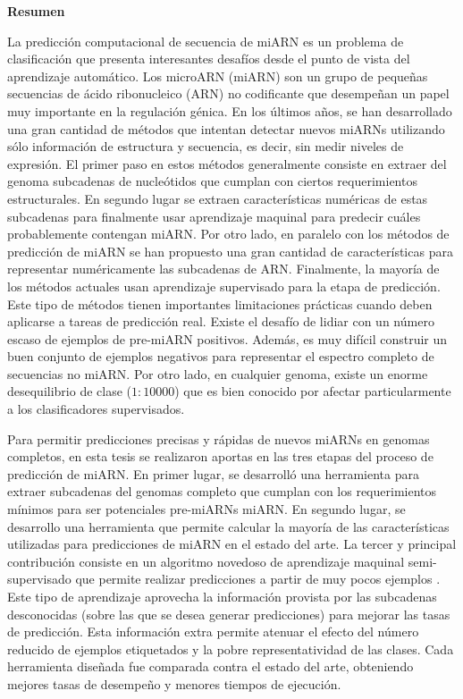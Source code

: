 \newpage
\thispagestyle{empty}

\vspace{3cm}
\begin{center}
{\huge \textbf{Resumen}}
\end{center}
\vspace{1cm}

La predicción computacional de secuencia de miARN es un problema de clasificación que presenta interesantes desafíos desde el punto de vista del
aprendizaje automático. Los microARN (miARN) son un grupo de pequeñas secuencias de ácido ribonucleico (ARN) no codificante que desempeñan un papel muy importante en la
regulación génica. En los últimos años, se han desarrollado una gran cantidad de métodos que intentan detectar nuevos miARNs utilizando sólo información
de estructura y secuencia, es decir, sin medir niveles de expresión. El primer paso en estos métodos generalmente consiste en extraer del genoma subcadenas
de nucleótidos que cumplan con ciertos requerimientos estructurales. En segundo lugar se extraen características numéricas de estas subcadenas para finalmente
usar aprendizaje maquinal para predecir cuáles probablemente contengan miARN. Por otro lado, en paralelo con los métodos de predicción de miARN se han propuesto
una gran cantidad de características para representar numéricamente las subcadenas de ARN. Finalmente, la mayoría de los métodos actuales usan aprendizaje
supervisado para la etapa de predicción. Este tipo de métodos tienen importantes limitaciones prácticas cuando deben aplicarse a tareas de predicción real.
Existe el desafío de lidiar con un número escaso de ejemplos de pre-miARN positivos. Además, es muy difícil construir un buen conjunto de
ejemplos negativos para representar el espectro completo de secuencias no miARN. Por otro lado, en cualquier genoma, existe un enorme desequilibrio de clase
($1:10000$) que es bien conocido por afectar particularmente a los clasificadores supervisados.

Para permitir predicciones precisas y rápidas de nuevos miARNs en genomas completos, en esta tesis se realizaron aportas en las tres etapas del proceso de predicción de miARN.
En primer lugar, se desarrolló una herramienta para extraer subcadenas del genomas completo que cumplan con los requerimientos mínimos para ser potenciales pre-miARNs
miARN. En segundo lugar, se desarrollo una herramienta que permite calcular la mayoría de las características utilizadas para predicciones de miARN en el estado
del arte. La tercer y principal contribución consiste en un algoritmo novedoso de aprendizaje maquinal semi-supervisado que permite realizar predicciones a partir de muy pocos
ejemplos . Este tipo de aprendizaje aprovecha la información provista por las subcadenas desconocidas (sobre las que se desea generar predicciones)
para mejorar las tasas de predicción. Esta información extra permite atenuar el efecto del número reducido de ejemplos etiquetados y la pobre
representatividad de las clases. Cada herramienta diseñada fue comparada contra el estado del arte, obteniendo mejores tasas de desempeño y menores tiempos de ejecución.

\newpage
\thispagestyle{empty}
